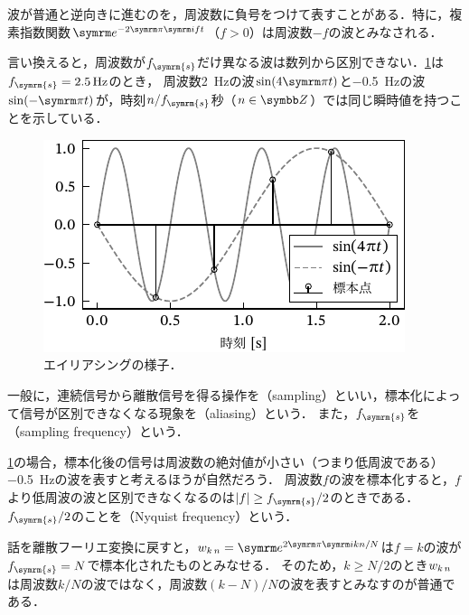 \documentclass[../../main]{subfiles}
\begin{document}
\begin{note}
  波が普通と逆向きに進むのを，周波数に負号をつけて表すことがある．特に，複素指数関数\(\napr^{-2\krez\iuni ft}\)（\(f>0\)）は周波数\(-f\)の波とみなされる．
\end{note}

言い換えると，周波数が\(f_{\symrm{s}}\)だけ異なる波は数列から区別できない．\cref{figure:aliasing}は\(f_{\symrm{s}}=\SI{2.5}{Hz}\)のとき，
周波数\SI{2}{Hz}の波\(\sin(4\krez t)\)と\SI{-0.5}{Hz}の波\(\sin(-\krez t)\)が，時刻\(n/f_{\symrm{s}}\)秒（\(n\in\numset{Z}\)）では同じ瞬時値を持つことを示している．

\begin{figure}[htbp]
  \centering
  \includegraphics{figures/aliasing.pdf}
  \caption{エイリアシングの様子．}
  \label{figure:aliasing}
\end{figure}

一般に，連続信号から離散信号を得る操作を（sampling）といい，標本化によって信号が区別できなくなる現象を（aliasing）という．
また，\(f_{\symrm{s}}\)を（sampling frequency）という．

\cref{figure:aliasing}の場合，標本化後の信号は周波数の絶対値が小さい（つまり低周波である）\SI{-0.5}{Hz}の波を表すと考えるほうが自然だろう．
周波数\(f\)の波を標本化すると，\(f\)より低周波の波と区別できなくなるのは\(\abs{f}\geq f_{\symrm{s}}/2\)のときである．\(f_{\symrm{s}}/2\)のことを（Nyquist frequency）という．

話を離散フーリエ変換に戻すと，\(\midx{w}{k}{n}=\napr^{2\krez\iuni kn/N}\)は\(f=k\)の波が\(f_{\symrm{s}}=N\)で標本化されたものとみなせる．
そのため，\(k\geq N/2\)のとき\(w_{k\,n}\)は周波数\(k/N\)の波ではなく，周波数\((k-N)/N\)の波を表すとみなすのが普通である．
\end{document}
